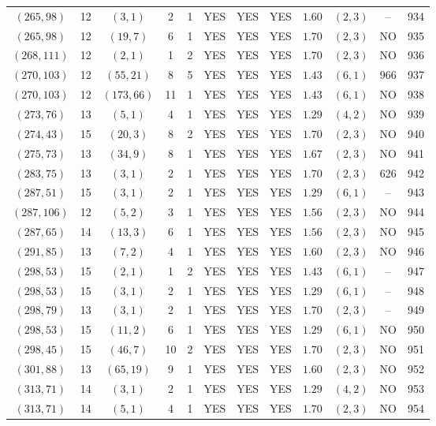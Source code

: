 \begin{longtable}{|c|c|c|c|c|c|c|c|c|c|c|c|}
$(265,98)$ & 12 & $(3,1)$ & 2 & 1 & YES & YES & YES & $1.60$ & $(2,3)$ & -- & 934\\
$(265,98)$ & 12 & $(19,7)$ & 6 & 1 & YES & YES & YES & $1.70$ & $(2,3)$ & NO & 935\\
$(268,111)$ & 12 & $(2,1)$ & 1 & 2 & YES & YES & YES & $1.70$ & $(2,3)$ & NO & 936\\
$(270,103)$ & 12 & $(55,21)$ & 8 & 5 & YES & YES & YES & $1.43$ & $(6,1)$ & 966 & 937\\
$(270,103)$ & 12 & $(173,66)$ & 11 & 1 & YES & YES & YES & $1.43$ & $(6,1)$ & NO & 938\\
$(273,76)$ & 13 & $(5,1)$ & 4 & 1 & YES & YES & YES & $1.29$ & $(4,2)$ & NO & 939\\
$(274,43)$ & 15 & $(20,3)$ & 8 & 2 & YES & YES & YES & $1.70$ & $(2,3)$ & NO & 940\\
$(275,73)$ & 13 & $(34,9)$ & 8 & 1 & YES & YES & YES & $1.67$ & $(2,3)$ & NO & 941\\
$(283,75)$ & 13 & $(3,1)$ & 2 & 1 & YES & YES & YES & $1.70$ & $(2,3)$ & 626 & 942\\
$(287,51)$ & 15 & $(3,1)$ & 2 & 1 & YES & YES & YES & $1.29$ & $(6,1)$ & -- & 943\\
$(287,106)$ & 12 & $(5,2)$ & 3 & 1 & YES & YES & YES & $1.56$ & $(2,3)$ & NO & 944\\
$(287,65)$ & 14 & $(13,3)$ & 6 & 1 & YES & YES & YES & $1.56$ & $(2,3)$ & NO & 945\\
$(291,85)$ & 13 & $(7,2)$ & 4 & 1 & YES & YES & YES & $1.60$ & $(2,3)$ & NO & 946\\
$(298,53)$ & 15 & $(2,1)$ & 1 & 2 & YES & YES & YES & $1.43$ & $(6,1)$ & -- & 947\\
$(298,53)$ & 15 & $(3,1)$ & 2 & 1 & YES & YES & YES & $1.29$ & $(6,1)$ & -- & 948\\
$(298,79)$ & 13 & $(3,1)$ & 2 & 1 & YES & YES & YES & $1.70$ & $(2,3)$ & -- & 949\\
$(298,53)$ & 15 & $(11,2)$ & 6 & 1 & YES & YES & YES & $1.29$ & $(6,1)$ & NO & 950\\
$(298,45)$ & 15 & $(46,7)$ & 10 & 2 & YES & YES & YES & $1.70$ & $(2,3)$ & NO & 951\\
$(301,88)$ & 13 & $(65,19)$ & 9 & 1 & YES & YES & YES & $1.60$ & $(2,3)$ & NO & 952\\
$(313,71)$ & 14 & $(3,1)$ & 2 & 1 & YES & YES & YES & $1.29$ & $(4,2)$ & NO & 953\\
$(313,71)$ & 14 & $(5,1)$ & 4 & 1 & YES & YES & YES & $1.70$ & $(2,3)$ & NO & 954\\

\end{longtable}
